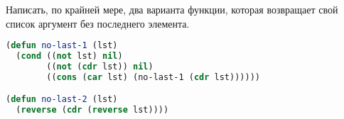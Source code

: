 Написать, по крайней мере, два варианта функции, которая возвращает
свой список аргумент без последнего элемента.

\begin{lstlisting}[language=Lisp]
(defun no-last-1 (lst)
  (cond ((not lst) nil)
        ((not (cdr lst)) nil)
        ((cons (car lst) (no-last-1 (cdr lst))))))

(defun no-last-2 (lst)
  (reverse (cdr (reverse lst))))
\end{lstlisting}

